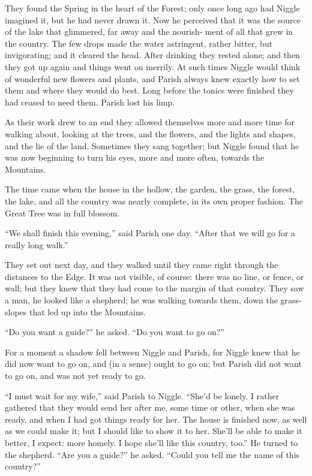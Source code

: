 \documentclass[english]{scrartcl}
\begin{document}
They found the Spring in the heart of the Forest; only once long ago had Niggle imagined it, but he had never drawn it. Now he perceived that it was the source of the lake that glimmered, far away and the nourish- ment of all that grew in the country. The few drops made the water astringent, rather bitter, but invigorating; and it cleared the head. After drinking they rested alone; and then they got up again and things went on merrily. At such times Niggle would think of wonderful new flowers and plants, and Parish always knew exactly how to set them and where they would do best. Long before the tonics were finished they had ceased to need them. Parish lost his limp.

As their work drew to an end they allowed themselves more and more time for walking about, looking at the trees, and the flowers, and the lights and shapes, and the lie of the land. Sometimes they sang together; but Niggle found that he was now beginning to turn his eyes, more and more often, towards the Mountains.

The time came when the house in the hollow, the garden, the grass, the forest, the lake, and all the country was nearly complete, in its own proper fashion. The Great Tree was in full blossom.

“We shall finish this evening,” said Parish one day. “After that we will go for a really long walk.”

They set out next day, and they walked until they came right through the distances to the Edge. It was not visible, of course: there was no line, or fence, or wall; but they knew that they had come to the margin of that country. They saw a man, he looked like a shepherd; he was walking towards them, down the grass-slopes that led up into the Mountains.

“Do you want a guide?” he asked. “Do you want to go on?”

For a moment a shadow fell between Niggle and Parish, for Niggle knew that he did now want to go on, and (in a sense) ought to go on; but Parish did not want to go on, and was not yet ready to go.

“I must wait for my wife,” said Parish to Niggle. “She’d be lonely. I rather gathered that they would send her after me, some time or other, when she was ready, and when I had got things ready for her. The house is finished now, as well as we could make it; but I should like to show it to her. She’ll be able to make it better, I expect: more homely. I hope she’ll like this country, too.” He turned to the shepherd. “Are you a guide?” he asked. “Could you tell me the name of this country?”
\end{document}
